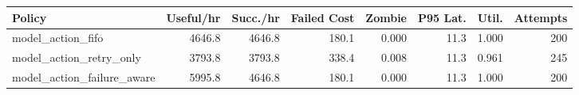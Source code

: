 \begin{tabular}{lrrrrrrr}
\toprule
Policy & Useful/hr & Succ./hr & Failed Cost & Zombie & P95 Lat. & Util. & Attempts \\
\midrule
model\_action\_fifo & 4646.8 & 4646.8 & 180.1 & 0.000 & 11.3 & 1.000 & 200 \\
model\_action\_retry\_only & 3793.8 & 3793.8 & 338.4 & 0.008 & 11.3 & 0.961 & 245 \\
model\_action\_failure\_aware & 5995.8 & 4646.8 & 180.1 & 0.000 & 11.3 & 1.000 & 200 \\
\bottomrule
\end{tabular}
